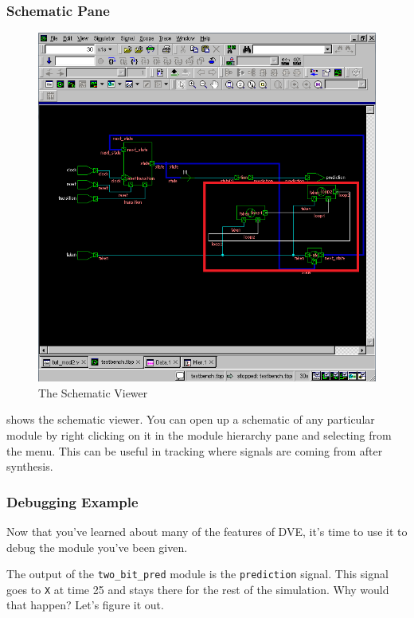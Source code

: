 \documentclass[dvipsnames]{article}
\begin{document}
\subsubsection{Schematic Pane}
\begin{figure}[H]
	\includegraphics[width=\textwidth]{schematic-viewer}
	\caption{The Schematic Viewer}
	\label{fig:schematic-viewer}
\end{figure}

 shows the schematic viewer. You can open up a 
schematic of any particular module by right clicking on it in the module 
hierarchy pane and selecting  from the menu. This can be 
useful in tracking where signals are coming from after synthesis. 

\subsubsection{Debugging Example}
Now that you've learned about many of the features of DVE, it's time to use it
to debug the module you've been given. 

The output of the \texttt{two\_bit\_pred} module is the \texttt{prediction}
signal. This signal goes to \texttt{X} at time 25 and stays there for the rest
of the simulation. Why would that happen? Let's figure it out.
\end{document}

